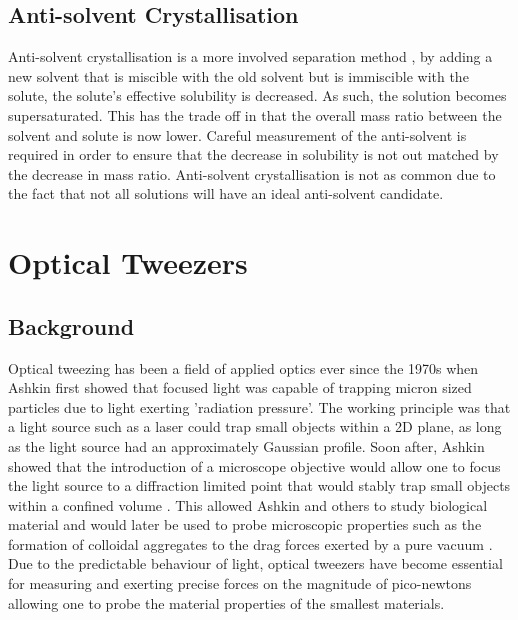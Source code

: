 \subsection{Anti-solvent Crystallisation} 
Anti-solvent crystallisation is a more involved separation method ,
by adding a new solvent that is miscible with the old solvent but is 
immiscible with the solute, the solute's effective solubility is decreased.
As such, the solution becomes supersaturated. This has the trade off in that the overall mass ratio between the solvent and solute is now lower. Careful
measurement of the anti-solvent is required in order to ensure that the 
decrease in solubility is not out matched by the decrease in mass ratio.
Anti-solvent crystallisation is not as common due to the fact that not all
solutions will have an ideal anti-solvent candidate.

\section{Optical Tweezers}
\subsection{Background}
Optical tweezing has been a field of applied optics ever since the 1970s
when Ashkin \cite{Ashkin1970} first showed that focused light was capable 
of trapping micron sized particles due to light exerting 'radiation pressure'. 
The working principle was that a light source such as a laser could trap 
small objects within a 2D plane, as long as the light source had an 
approximately Gaussian profile. Soon after, Ashkin showed that the introduction 
of a microscope objective would allow one to focus the light source to a 
diffraction limited point that would stably trap small objects within a 
confined volume \cite{Ashkin1980}. This allowed Ashkin and others to study 
biological material and would later be used to probe microscopic properties 
such as the formation of colloidal aggregates \cite{Yi2021} to the drag 
forces exerted by a pure vacuum \cite{Ahn2018, Monteiro2018}. Due to the 
predictable behaviour of light, optical tweezers have become essential for 
measuring and exerting precise forces on the magnitude of pico-newtons 
allowing one to probe the material properties of the smallest materials. 

